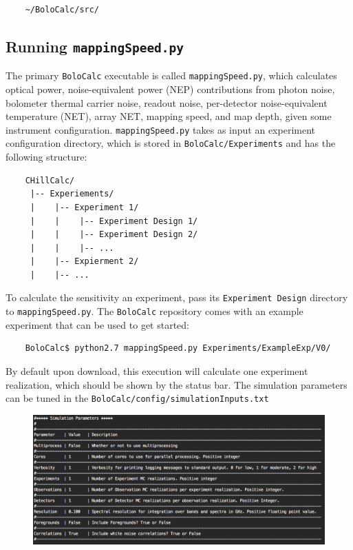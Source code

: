 \documentclass[11pt]{article} %
\begin{document}
\begin{lstlisting}
	~/BoloCalc/src/
\end{lstlisting}


\subsection{Running \texttt{mappingSpeed.py}}
\label{sec:runms}

The primary \texttt{BoloCalc} executable is called \texttt{mappingSpeed.py}, which calculates optical power, noise-equivalent power (NEP) contributions from photon noise, bolometer thermal carrier noise, readout noise, per-detector noise-equivalent temperature (NET), array NET, mapping speed, and map depth, given some instrument configuration. \texttt{mappingSpeed.py} takes as input an experiment configuration directory, which is stored in \texttt{BoloCalc/Experiments} and has the following structure:

\begin{lstlisting}
	CHillCalc/
	 |-- Experiements/
	 |    |-- Experiment 1/
	 |    |    |-- Experiment Design 1/
	 |    |    |-- Experiment Design 2/
	 |    |    |-- ...
	 |    |-- Expierment 2/
	 |    |-- ...
\end{lstlisting}
			
To calculate the sensitivity an experiment, pass its \texttt{Experiment Design} directory to \texttt{mappingSpeed.py}. The \texttt{BoloCalc} repository comes with an example  experiment that can be used to get started: 

\begin{lstlisting}
	BoloCalc$ python2.7 mappingSpeed.py Experiments/ExampleExp/V0/	
\end{lstlisting}

By default upon download, this execution will calculate one experiment realization, which should be shown by the status bar. The simulation parameters can be tuned in the \texttt{BoloCalc/config/simulationInputs.txt}

\begin{figure}[h!]
	\centering
	\includegraphics[width=1.0\textwidth]{SimulationInputs_Example}
\end{figure}
\end{document}
